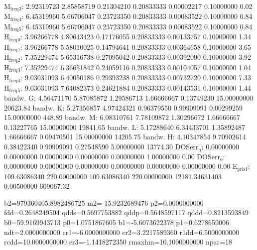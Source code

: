\documentclass[11pt]{article}
\begin{document}
M\(_{\text{freq}}\)\(_{\text{3}}\):   2.92319723   2.85858719   0.21304210   0.20833333   0.00002217   0.10000000         0.02
M\(_{\text{freq}}\)\(_{\text{4}}\):   6.45319960   5.66706047   0.23723350   0.20833333   0.00083522   0.10000000         0.84
M\(_{\text{freq}}\)\(_{\text{5}}\):   6.45319960   5.66706047   0.23723350   0.20833333   0.00083522   0.10000000         0.84
H\(_{\text{freq}}\)\(_{\text{0}}\):   3.96266778   4.80643423   0.17176055   0.20833333   0.00133757   0.10000000         1.34
H\(_{\text{freq}}\)\(_{\text{1}}\):   3.96266778   5.58010025   0.14794641   0.20833333   0.00364658   0.10000000         3.65
H\(_{\text{freq}}\)\(_{\text{2}}\):   7.35229474   5.65316738   0.27095042   0.20833333   0.00392090   0.10000000         3.92
H\(_{\text{freq}}\)\(_{\text{3}}\):   7.35229474   6.36651842   0.24059116   0.20833333   0.00104057   0.10000000         1.04
H\(_{\text{freq}}\)\(_{\text{4}}\):   9.03031093   6.40050186   0.29393238   0.20833333   0.00732720   0.10000000         7.33
H\(_{\text{freq}}\)\(_{\text{5}}\):   9.03031093   7.64082373   0.24621884   0.20833333   0.00143531   0.10000000         1.44
bandw. G:   4.56471170   5.87085872   1.29586713   1.66666667   0.13749230  15.00000000     20623.84
bandw. K:   5.27356857   4.97424321   0.96379550   0.90909091   0.00299259  15.00000000       448.89
bandw. M:   6.08310761   7.78109872   1.30296672   1.66666667   0.13227765  15.00000000     19841.65
bandw. L:   5.17288640   6.34433701   1.35892487   1.66666667   0.09470501  15.00000000     14205.75
bandw. H:   4.10347854   9.70902614   0.38422340   0.90909091   0.27548590   5.00000000     13774.30
DOSerr\(_{\text{h}}\):   0.00000000   0.00000000   0.00000000   0.00000000   0.00000000   1.00000000         0.00
DOSerr\(_{\text{o}}\):   0.00000000   0.00000000   0.00000000   0.00000000   0.00000000   0.00000000         0.00
E\(_{\text{pris}}\)\(_{\text{f}}\): 109.63086340 220.00000000 109.63086340 220.00000000 12181.34631403   0.00500000    609067.32


b2=979360405.8982486725 m2=-15.9232689476 p2=0.0000000000 fdd=0.2648249504 qdds=0.5697753882 qddp=0.5648597117 qddd=0.8213593849 b0=59.9169943713 p0=1.0751867605 b1=-5.6073622378 p1=0.6278659006 ndt=2.0000000000 cr1=-6.0000000000 cr2=3.2217589360 r1dd=6.5000000000 rcdd=10.0000000000 cr3=-1.1418272350 rmaxhm=10.1000000000 npar=18 
\end{document}
